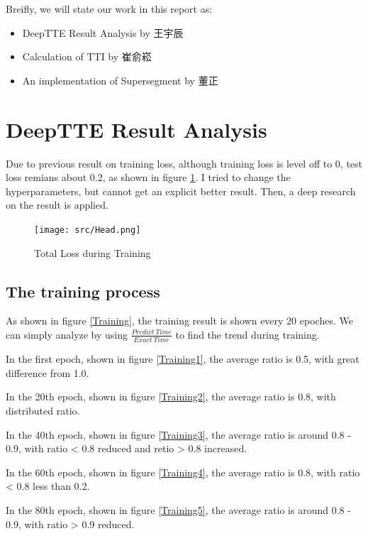\documentclass[fontset=none]{ctexart}
\theoremstyle{definition}
\theoremstyle{remark}
\begin{document}
Breifly, we will state our work in this report as:
\begin{itemize}
    \item DeepTTE Result Analysis by 王宇辰
    \item Calculation of TTI by 崔俞崧
    \item An implementation of Supersegment by 董正
\end{itemize}

\clearpage
\section{DeepTTE Result Analysis}

    Due to previous result on training loss, although training loss is level off to 0, test loss remians about 0.2, as shown in figure \ref{head}. I tried to change the hyperparameters, but cannot get an explicit better result. Then, a deep research on the result is applied.

    \begin{figure}[H]
        \centering
        \texttt{[image: src/Head.png]}
        \newline
        \label{head}
        \caption{Total Loss during Training}
    \end{figure}

        \subsection{The training process}

            As shown in figure \ref{Training}, the training result is shown every 20 epoches. We can simply analyze by using $\frac{Predict\ Time}{Exact\ Time}$ to find the trend during training.

            In the first epoch, shown in figure \ref{Training1}, the average ratio is 0.5, with great difference from 1.0.

            In the 20th epoch, shown in figure \ref{Training2}, the average ratio is 0.8, with distributed ratio.

            In the 40th epoch, shown in figure \ref{Training3}, the average ratio is around 0.8 - 0.9, with ratio < 0.8 reduced and retio > 0.8 increased.

            In the 60th epoch, shown in figure \ref{Training4}, the average ratio is 0.8, with ratio < 0.8 less than 0.2.

            In the 80th epoch, shown in figure \ref{Training5}, the average ratio is around 0.8 - 0.9, with ratio > 0.9 reduced.
\end{document}
